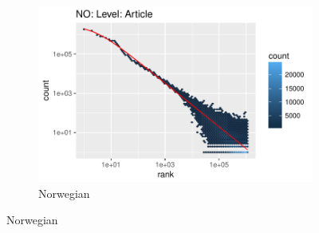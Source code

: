 \documentclass{article}
\begin{document}
\begin{figure}
\begin{subfigure}[b]{0.3\textwidth}
		\includegraphics[trim={0 0 2.2cm 0.6cm},clip, width=\textwidth]{NO_Article_mle.pdf}
		\caption{Norwegian}
		\label{fig:no_mle}
	\end{subfigure}
	

\end{figure}
\end{document}
